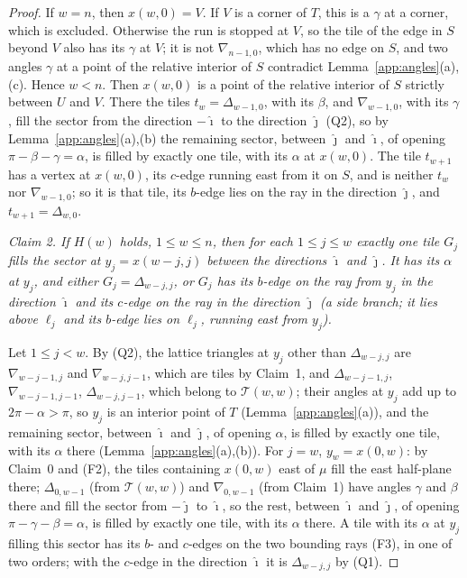 \documentclass[11pt]{amsart}
\theoremstyle{remark}
\begin{document}
\begin{proof}
If $w=n$, then $x(w,0)=V$. If $V$ is a corner of $T$, this is a $\gamma$ at a corner, which is excluded. Otherwise the run is stopped at $V$, so the tile of the edge in $S$ beyond $V$ also has its $\gamma$ at $V$; it is not $\nabla_{n-1,0}$, which has no edge on $S$, and two angles $\gamma$ at a point of the relative interior of $S$ contradict Lemma~\ref{app:angles}(a),(c). Hence $w<n$. Then $x(w,0)$ is a point of the relative interior of $S$ strictly between $U$ and $V$. There the tiles $t_w=\Delta_{w-1,0}$, with its $\beta$, and $\nabla_{w-1,0}$, with its $\gamma$, fill the sector from the direction $-\hat\imath$ to the direction $\hat\jmath$ (Q2), so by Lemma~\ref{app:angles}(a),(b) the remaining sector, between $\hat\jmath$ and $\hat\imath$, of opening $\pi-\beta-\gamma=\alpha$, is filled by exactly one tile, with its $\alpha$ at $x(w,0)$. The tile $t_{w+1}$ has a vertex at $x(w,0)$, its $c$-edge running east from it on $S$, and is neither $t_w$ nor $\nabla_{w-1,0}$; so it is that tile, its $b$-edge lies on the ray in the direction $\hat\jmath$, and $t_{w+1}=\Delta_{w,0}$.

\emph{Claim 2. If $H(w)$ holds, $1\le w\le n$, then for each $1\le j\le w$ exactly one tile $G_j$ fills the sector at $y_j=x(w-j,j)$ between the directions $\hat\imath$ and $\hat\jmath$. It has its $\alpha$ at $y_j$, and either $G_j=\Delta_{w-j,j}$, or $G_j$ has its $b$-edge on the ray from $y_j$ in the direction $\hat\imath$ and its $c$-edge on the ray in the direction $\hat\jmath$ \textup{(}a \emph{side branch}; it lies above $\ell_j$ and its $b$-edge lies on $\ell_j$, running east from $y_j$\textup{)}.}

Let $1\le j<w$. By (Q2), the lattice triangles at $y_j$ other than $\Delta_{w-j,j}$ are $\nabla_{w-j-1,j}$ and $\nabla_{w-j,j-1}$, which are tiles by Claim~1, and $\Delta_{w-j-1,j}$, $\nabla_{w-j-1,j-1}$, $\Delta_{w-j,j-1}$, which belong to $\mathcal{T}(w,w)$; their angles at $y_j$ add up to $2\pi-\alpha>\pi$, so $y_j$ is an interior point of $T$ (Lemma~\ref{app:angles}(a)), and the remaining sector, between $\hat\imath$ and $\hat\jmath$, of opening $\alpha$, is filled by exactly one tile, with its $\alpha$ there (Lemma~\ref{app:angles}(a),(b)). For $j=w$, $y_w=x(0,w)$: by Claim~0 and (F2), the tiles containing $x(0,w)$ east of $\mu$ fill the east half-plane there; $\Delta_{0,w-1}$ (from $\mathcal{T}(w,w)$) and $\nabla_{0,w-1}$ (from Claim~1) have angles $\gamma$ and $\beta$ there and fill the sector from $-\hat\jmath$ to $\hat\imath$, so the rest, between $\hat\imath$ and $\hat\jmath$, of opening $\pi-\gamma-\beta=\alpha$, is filled by exactly one tile, with its $\alpha$ there. A tile with its $\alpha$ at $y_j$ filling this sector has its $b$- and $c$-edges on the two bounding rays (F3), in one of two orders; with the $c$-edge in the direction $\hat\imath$ it is $\Delta_{w-j,j}$ by (Q1).


\end{proof}
\end{document}
